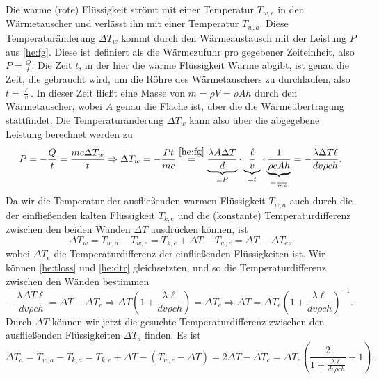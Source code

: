 \begin{Answer}[ref= heate]
	Die warme (rote) Flüssigkeit strömt mit einer Temperatur $T_{w,e}$ in den Wärmetauscher und verlässt ihn mit einer Temperatur $T_{w,a}$. Diese Temperaturänderung  $\Delta T_w$ kommt durch den Wärmeaustausch mit der Leistung $P$ aus \eqref{he:fg}. 
	Diese ist definiert als die Wärmezufuhr pro gegebener Zeiteinheit, also $P = \frac{Q}{t}$. Die Zeit $t$, in der hier die warme Flüssigkeit Wärme abgibt, ist genau die Zeit, die gebraucht wird, um die Röhre des Wärmetauschers zu durchlaufen, also $ t = \frac{\ell}{v}$. In dieser Zeit fließt eine Masse von $m = \rho V = \rho A h$ durch den Wärmetauscher, wobei $A$ genau die Fläche ist, über die die Wärmeübertragung stattfindet. Die Temperaturänderung $\Delta T_w$ kann also über die abgegebene Leistung berechnet werden zu
	\begin{equation}\label{he:tloss}
		P = -\frac{Q}{t} = \frac{m c \Delta T_w}{t} \Rightarrow \Delta T_w =- \frac{Pt}{mc} \overset{\eqref{he:fg}}{=} \underbrace{\frac{\lambda A \Delta T }{d}}_{=P}\cdot \underbrace{\frac{\ell}{v}}_{= t}\cdot \underbrace{\frac{1}{\rho c A h}}_{=\frac{1}{mc}} = -\frac{\lambda \Delta T\ell}{dv\rho c h}.
	\end{equation}
	Da wir die Temperatur der ausfließenden warmen Flüssigkeit $T_{w,a}$ auch durch die der einfließenden kalten Flüssigkeit $T_{k,e}$ und die (konstante) Temperaturdifferenz zwischen den beiden Wänden $\Delta T$ ausdrücken können, ist
	\begin{equation}\label{he:dtr}
		\Delta T_{w} = T_{w,a} - T_{w,e} = T_{k,e}+\Delta T - T_{w,e} = \Delta T - \Delta T_e,
	\end{equation}
	wobei $\Delta T_e$ die Temperaturdifferenz der einfließenden Flüssigkeiten ist. 
	Wir können \eqref{he:tloss} und \eqref{he:dtr} gleichsetzten, und so die Temperaturdifferenz zwischen den Wänden bestimmen
	\begin{equation}\label{he:tdiffwall}
	-\frac{\lambda \Delta T\ell}{dv\rho c h} = \Delta T - \Delta T_e \Rightarrow \Delta T \left(1+\frac{\lambda \ell}{dv\rho c h}\right) = \Delta T_e\Rightarrow \Delta T = \Delta T_e \left(1+\frac{\lambda \ell}{dv\rho c h}\right)^{-1}.
	\end{equation}
	Durch $\Delta T$ können wir jetzt die gesuchte Temperaturdifferenz zwischen den ausfließenden Flüssigkeiten $\Delta T_a$ finden. Es ist 
	\begin{equation}
	\boxed{
		\Delta T_a = T_{w,a} - T_{k,a} = T_{k,e} + \Delta T - \left(T_{w,e}-\Delta T\right) = 2\Delta T - \Delta T_{e} =\Delta T_e\left( \frac{2}{1+\frac{\lambda \ell}{dv\rho c h}}-1\right).}
	\end{equation}
\end{Answer}